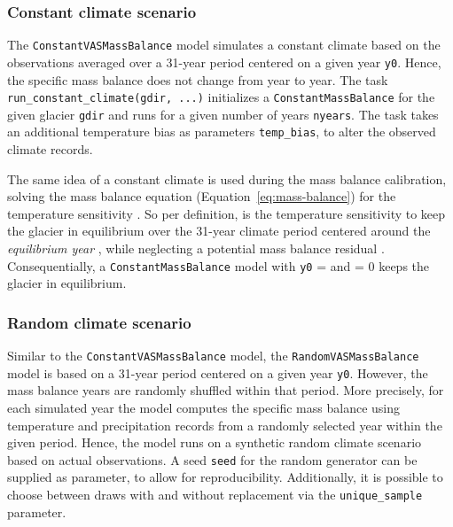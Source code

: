 
        \subsubsection{Constant climate scenario} %
        \label{ssub:constant_climate_scenario_implementation}
            The \lstinline`ConstantVASMassBalance` model simulates a constant climate based on the observations averaged over a 31-year period centered on a given year \lstinline`y0`. Hence, the specific mass balance does not change from year to year. The task \lstinline`run_constant_climate(gdir, ...)` initializes a \lstinline`ConstantMassBalance` for the given glacier \lstinline`gdir` and runs for a given number of years \lstinline`nyears`. The task takes an additional temperature bias as parameters \lstinline`temp_bias`, to alter the observed climate records.

            The same idea of a constant climate is used during the mass balance calibration, solving the mass balance equation (Equation~\ref{eq:mass-balance}) for the temperature sensitivity \mustar. So per definition, \mustar{} is the temperature sensitivity to keep the glacier in equilibrium over the 31-year climate period centered around the \textit{equilibrium year} \tstar{}, while neglecting a potential mass balance residual \bias. Consequentially, a \lstinline`ConstantMassBalance` model with \lstinline`y0` = \tstar{} and \bias{} = 0 keeps the glacier in equilibrium.
        

        \subsubsection{Random climate scenario} %
        \label{ssub:random_climate_scenario_implementation}

            Similar to the \lstinline`ConstantVASMassBalance` model, the \lstinline`RandomVASMassBalance` model is based on a 31-year period centered on a given year \lstinline`y0`. However, the mass balance years are randomly shuffled within that period. More precisely, for each simulated year the model computes the specific mass balance using temperature and precipitation records from a randomly selected year within the given period. Hence, the model runs on a synthetic random climate scenario based on actual observations. A seed \lstinline`seed` for the random generator can be supplied as parameter, to allow for reproducibility. Additionally, it is possible to choose between draws with and without replacement via the \lstinline`unique_sample` parameter.

